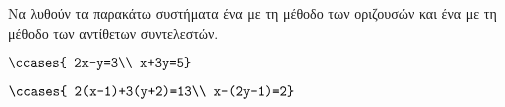 Να λυθούν τα παρακάτω συστήματα ένα με τη μέθοδο των οριζουσών και ένα με τη μέθοδο των αντίθετων συντελεστών.
\begin{multicols}{2}
\begin{erwthma}
\item $\ccases{
2x-y=3\\
x+3y=5}$
\item $\ccases{
2(x-1)+3(y+2)=13\\
x-(2y-1)=2}$
\end{erwthma}\end{multicols}